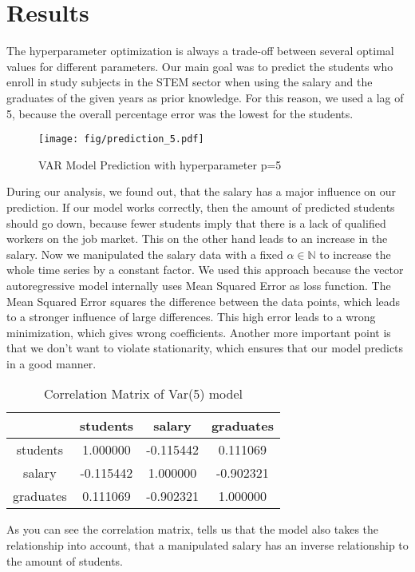 \documentclass{article}
\theoremstyle{plain}
\theoremstyle{definition}
\theoremstyle{remark}
\begin{document}
\section{Results}\label{sec:results}
The hyperparameter optimization is always a trade-off between several optimal values for different parameters. 
Our main goal was to predict the students who enroll in study subjects in the STEM sector when using the salary and the
graduates of the given years as prior knowledge. For this reason, we used a lag of 5, because the overall percentage error
was the lowest for the students.
\begin{figure*}
    \texttt{[image: fig/prediction\_5.pdf]}
    \caption{VAR Model Prediction with hyperparameter p=5}
\end{figure*}
During our analysis, we found out, that the salary has a major influence on our prediction. If our model works correctly, then the amount
of predicted students should go down, because fewer students imply that there is a lack of qualified workers on the job market.
This on the other hand leads to an increase in the salary. Now we manipulated the salary data with a fixed $\alpha\in \mathbb{N}$ to increase
the whole time series by a constant factor. We used this approach because the vector autoregressive model internally uses Mean Squared Error as loss function.
The Mean Squared Error squares the difference between the data points, which leads to a stronger influence of large differences.
This high error leads to a wrong minimization, which gives wrong coefficients.
Another more important point is that we don't want to violate stationarity, which ensures that our model predicts in a good manner.\\
\begin{table}[H]
    \centering
    \begin{tabular}{c|c|c|c}
        & students & salary & graduates\\
        \hline
        students & 1.000000 & -0.115442 &  0.111069\\
        \hline
        salary & -0.115442 & 1.000000 & -0.902321\\
        \hline
        graduates & 0.111069 & -0.902321 &  1.000000\\
    \end{tabular}
    \caption{Correlation Matrix of Var(5) model}
\end{table}

As you can see the correlation matrix, tells us that the model also takes the relationship into account, that a 
manipulated salary has an inverse relationship to the amount of students.
\end{document}
